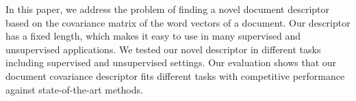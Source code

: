 In this paper, we address the problem of finding a novel document descriptor based on the covariance matrix of the word vectors of a document. Our descriptor has a fixed length, which makes it easy to use in many supervised and unsupervised applications. We tested our novel descriptor in different tasks including supervised and unsupervised settings. Our evaluation shows that our document covariance descriptor fits different tasks with competitive performance against state-of-the-art methods.
